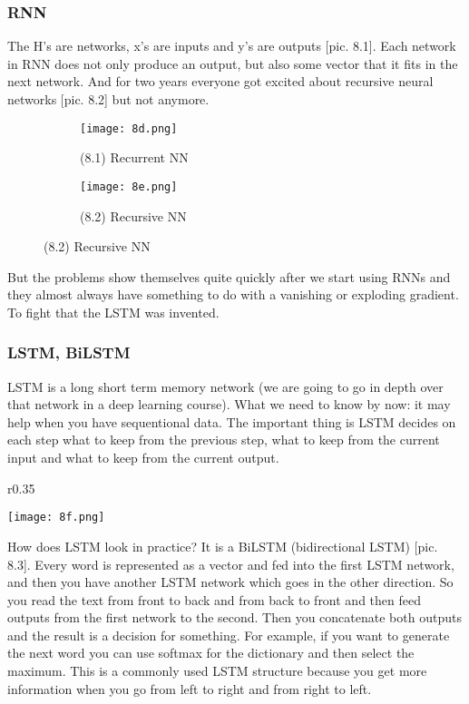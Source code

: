 \subsubsection*{RNN}

The H's are networks, x's are inputs and y's are outputs [pic. 8.1]. Each network in RNN does not only produce an output, but also some vector that it fits in the next network. And for two years everyone got excited about recursive neural networks [pic. 8.2] but not anymore.\\
\begin{figure}[h]
  \centering
  \begin{subfigure}[c]{0.5\linewidth}
    \texttt{[image: 8d.png]}
    \caption*{(8.1) Recurrent NN}
  \end{subfigure}
  \hspace{2cm}
  \begin{subfigure}[c]{0.3\linewidth}
    \texttt{[image: 8e.png]}
    \caption*{(8.2) Recursive NN}
  \end{subfigure}
\end{figure}
But the problems show themselves quite quickly after we start using RNNs and they almost always have something to do with a vanishing or exploding gradient. {\it <The intuition why it happens>} To fight that the LSTM was invented.

\subsubsection*{LSTM, BiLSTM}

LSTM is a long short term memory network (we are going to go in depth over that network in a deep learning course). What we need to know by now: it may help when you have sequentional data. The important thing is LSTM decides on each step what to keep from the previous step, what to keep from the current input and what to keep from the current output.
\begin{wrapfigure}{r}{0.35\linewidth}
  \vspace{-1.4cm}
  \begin{center}
    \texttt{[image: 8f.png]}
  \end{center}
  \vspace{-0.6cm}
  \caption*{(8.3) BiLSTM}
  \vspace{-0.8cm}
\end{wrapfigure}
How does LSTM look in practice? It is a BiLSTM (bidirectional LSTM) [pic. 8.3]. Every word is represented as a vector and fed into the first LSTM network, and then you have another LSTM network which goes in the other direction. So you read the text from front to back and from back to front and then feed outputs from the first network to the second. Then you concatenate both outputs and the result is a decision for something. For example, if you want to generate the next word you can use softmax for the dictionary and then select the maximum. This is a commonly used LSTM structure because you get more information when you go from left to right and from right to left.

